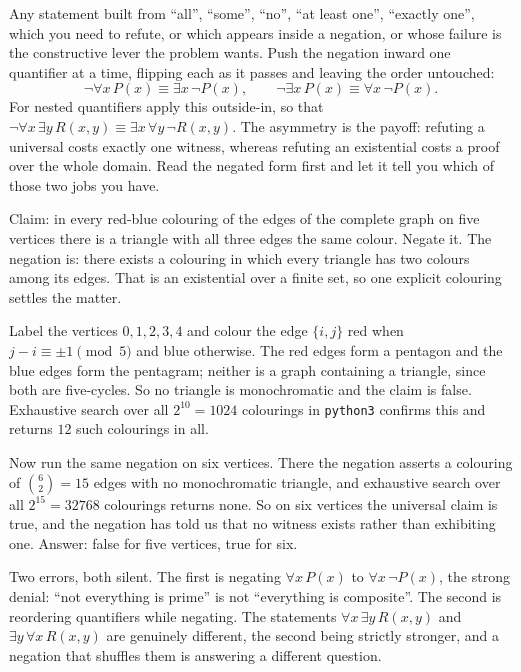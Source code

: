 \cue Any statement built from ``all'', ``some'', ``no'', ``at least one'', ``exactly one'', which you need to refute, or which appears inside a negation, or whose failure is the constructive lever the problem wants.
\method Push the negation inward one quantifier at a time, flipping each as it passes and leaving the order untouched:
\[\lnot\forall x\,P(x)\equiv\exists x\,\lnot P(x),\qquad \lnot\exists x\,P(x)\equiv\forall x\,\lnot P(x).\]
For nested quantifiers apply this outside-in, so that $\lnot\forall x\,\exists y\,R(x,y)\equiv\exists x\,\forall y\,\lnot R(x,y)$. The asymmetry is the payoff: refuting a universal costs exactly one witness, whereas refuting an existential costs a proof over the whole domain. Read the negated form first and let it tell you which of those two jobs you have.

\begin{worked}
Claim: in every red-blue colouring of the edges of the complete graph on five vertices there is a triangle with all three edges the same colour. Negate it. The negation is: there exists a colouring in which every triangle has two colours among its edges. That is an existential over a finite set, so one explicit colouring settles the matter.

Label the vertices $0,1,2,3,4$ and colour the edge $\{i,j\}$ red when $j-i\equiv\pm1\pmod5$ and blue otherwise. The red edges form a pentagon and the blue edges form the pentagram; neither is a graph containing a triangle, since both are five-cycles. So no triangle is monochromatic and the claim is false. Exhaustive search over all $2^{10}=1024$ colourings in \texttt{python3} confirms this and returns $12$ such colourings in all.

Now run the same negation on six vertices. There the negation asserts a colouring of $\binom{6}{2}=15$ edges with no monochromatic triangle, and exhaustive search over all $2^{15}=32768$ colourings returns none. So on six vertices the universal claim is true, and the negation has told us that no witness exists rather than exhibiting one. Answer: false for five vertices, true for six.
\end{worked}

\begin{trap}
Two errors, both silent. The first is negating $\forall x\,P(x)$ to $\forall x\,\lnot P(x)$, the strong denial: ``not everything is prime'' is not ``everything is composite''. The second is reordering quantifiers while negating. The statements $\forall x\,\exists y\,R(x,y)$ and $\exists y\,\forall x\,R(x,y)$ are genuinely different, the second being strictly stronger, and a negation that shuffles them is answering a different question.
\end{trap}

